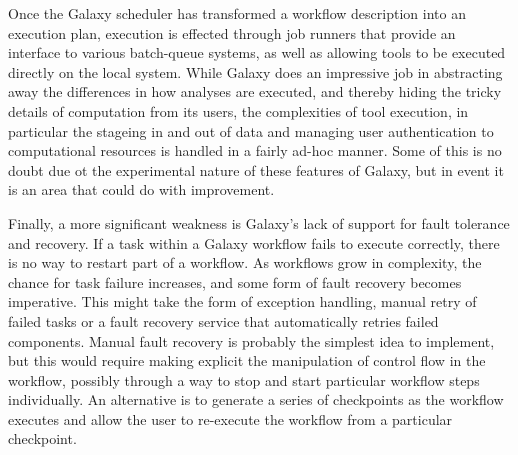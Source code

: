 \documentclass[a4paper,10pt]{scrreprt} \usepackage[utf8]{inputenc}
\begin{document}
Once the Galaxy scheduler has transformed a workflow description into an execution plan, execution is effected through job runners that provide an interface to various batch-queue systems, as well as allowing tools to be executed directly on the local system. While Galaxy does an impressive job in abstracting away the differences in how analyses are executed, and thereby hiding the tricky details of computation from its users, the complexities of tool execution, in particular the stageing in and out of data and managing user authentication to computational resources is handled in a fairly ad-hoc manner. Some of this is no doubt due ot the experimental nature of these features of Galaxy, but in event it is an area that could do with improvement.

Finally, a more significant weakness is Galaxy's lack of support for fault tolerance and recovery. If a task within a Galaxy workflow fails to execute correctly, there is no way to restart part of a workflow. As workflows grow in complexity, the chance for task failure increases, and some form of fault recovery becomes imperative. This might take the form of exception handling, manual retry of failed tasks or a fault recovery service that automatically retries failed components. Manual fault recovery is probably the simplest idea to implement, but this would require making explicit the manipulation of control flow in the workflow, possibly through a way to stop and start particular workflow steps individually. An alternative is to generate a series of checkpoints as the workflow executes and allow the user to re-execute the workflow from a particular checkpoint.
\end{document}
